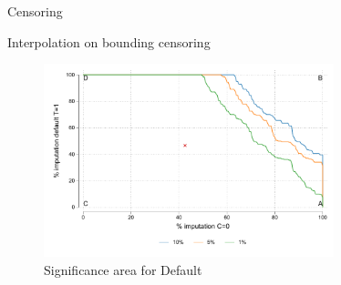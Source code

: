 \documentclass[8pt]{beamer}
\begin{document}
\begin{frame}{Censoring}
\label{censoring}
    \begin{table}[H]
\caption{Bounding censoring}
\label{bounding_censoring}
\begin{center}
\resizebox{0.9\textwidth}{!}{
\footnotesize{}
}
\end{center}
 \scriptsize 
\end{table}


\end{frame}


\begin{frame}{Interpolation on bounding censoring}
    
\begin{figure}[H]
        \caption{Significance area for Default}
  
    \begin{center}
        \includegraphics[width=0.75\textwidth]{Figuras/frontera_sig_def_imp.pdf}
    \end{center}
\end{figure}
 \hyperlink{main_results}{}
\end{frame}






\end{document}
